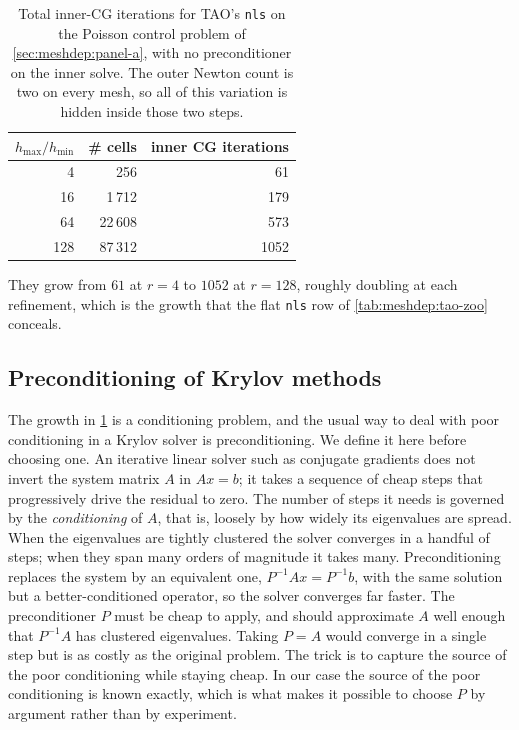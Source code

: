 \documentclass[a4paper,11pt]{article}
\theoremstyle{spacedplain} \newtheorem{theorem}[counter]{Theorem} \newtheorem{lemma}[counter]{Lemma} \newtheorem{prop}[counter]{Proposition} \newtheorem{cor}[counter]{Corollary}
\theoremstyle{spaceddefinition} \newtheorem{defn}[counter]{Definition} \newtheorem{example}[counter]{Example} \newtheorem{remark}[counter]{Remark}
\begin{document}
\begin{table}[H]
  \centering
  \setlength{\tabcolsep}{10pt}
  \begin{tabular}{r r r}
    \toprule
    {$h_{\max}/h_{\min}$} & {\# cells} & {inner CG iterations} \\
    \midrule
      4 &     256 &   61 \\
     16 &   1\,712 &  179 \\
     64 &  22\,608 &  573 \\
    128 &  87\,312 & 1052 \\
    \bottomrule
  \end{tabular}
  \caption{Total inner-CG iterations for TAO's \texttt{nls} on the Poisson control problem of \cref{sec:meshdep:panel-a}, with no preconditioner on the inner solve. The outer Newton count is two on every mesh, so all of this variation is hidden inside those two steps.}
  \label{tab:meshdep:inner-cg-baseline}
\end{table}

They grow from $61$ at $r = 4$ to $1052$ at $r = 128$, roughly doubling at each refinement, which is the growth that the flat \texttt{nls} row of \cref{tab:meshdep:tao-zoo} conceals.

\subsection{Preconditioning of Krylov methods}
\label{sec:precond:definition}

The growth in \cref{tab:meshdep:inner-cg-baseline} is a conditioning problem, and the usual way to deal with poor conditioning in a Krylov solver is preconditioning. We define it here before choosing one. An iterative linear solver such as conjugate gradients does not invert the system matrix $A$ in $A x = b$; it takes a sequence of cheap steps that progressively drive the residual to zero. The number of steps it needs is governed by the \emph{conditioning} of $A$, that is, loosely by how widely its eigenvalues are spread. When the eigenvalues are tightly clustered the solver converges in a handful of steps; when they span many orders of magnitude it takes many. Preconditioning replaces the system by an equivalent one, $P^{-1} A x = P^{-1} b$, with the same solution but a better-conditioned operator, so the solver converges far faster. The preconditioner $P$ must be cheap to apply, and should approximate $A$ well enough that $P^{-1} A$ has clustered eigenvalues. Taking $P = A$ would converge in a single step but is as costly as the original problem. The trick is to capture the source of the poor conditioning while staying cheap. In our case the source of the poor conditioning is known exactly, which is what makes it possible to choose $P$ by argument rather than by experiment.
\end{document}

